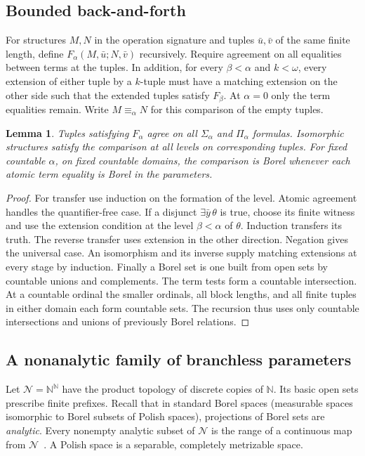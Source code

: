 \documentclass[11pt,letterpaper]{article}
\newtheorem{lemma}[theorem]{Lemma}
\theoremstyle{definition}\newtheorem{definition}[theorem]{Definition}
\newcommand{\N}{\mathbb N}
\newcommand{\Baire}{\mathcal N}
\begin{document}
\subsection{Bounded back-and-forth}
For structures \(M,N\) in the operation signature and tuples
\(\bar u,\bar v\) of the same finite length, define
\(F_\alpha(M,\bar u;N,\bar v)\) recursively. Require agreement on all
equalities between terms at the tuples. In addition, for every
\(\beta<\alpha\) and \(k<\omega\), every extension of either tuple by a
\(k\)-tuple must have a matching extension on the other side such that
the extended tuples satisfy \(F_\beta\). At \(\alpha=0\) only the term
equalities remain. Write \(M\equiv_\alpha N\) for this comparison of the
empty tuples.

\begin{lemma}\label{lem:bf}
Tuples satisfying \(F_\alpha\) agree on all \(\Sigma_\alpha\) and
\(\Pi_\alpha\) formulas. Isomorphic structures satisfy the comparison at
all levels on corresponding tuples. For fixed countable \(\alpha\), on
fixed countable domains, the comparison is Borel whenever each atomic
term equality is Borel in the parameters.
\end{lemma}
\begin{proof}
For transfer use induction on the formation of the level. Atomic
agreement handles the quantifier-free case. If a disjunct
\(\exists\bar y\,\theta\) is true, choose its finite witness and use the
extension condition at the level \(\beta<\alpha\) of \(\theta\).
Induction transfers its truth. The reverse transfer uses extension in the
other direction. Negation gives the universal case. An isomorphism and
its inverse supply matching extensions at every stage by induction.
Finally a Borel set is one built from open sets by countable unions and
complements. The term tests form a countable intersection. At a
countable ordinal the smaller ordinals, all block lengths, and all finite
tuples in either domain each form countable sets. The recursion thus uses
only countable intersections and unions of previously Borel relations.
\end{proof}

\subsection{A nonanalytic family of branchless parameters}
Let \(\Baire=\N^{\N}\) have the product topology of discrete copies of
\(\N\). Its basic open sets prescribe finite prefixes. Recall that in
standard Borel spaces (measurable spaces isomorphic to Borel subsets of
Polish spaces), projections of Borel sets are \emph{analytic}. Every
nonempty analytic subset of \(\Baire\) is the range of a continuous map
from \(\Baire\)~\cite[\S14]{kechris}. A Polish space is a separable,
completely metrizable space.
\end{document}
